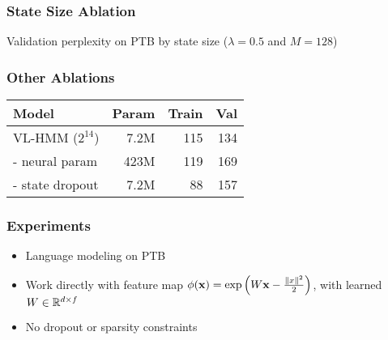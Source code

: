 \documentclass{beamer}
\begin{document}
\begin{frame}
\frametitle{State Size Ablation}

\centering
{}

\vspace{2em}

Validation perplexity on PTB by state size ($\lambda =0.5$ and $M=128$)
\end{frame}

\begin{frame}
\frametitle{Other Ablations}

\begin{center}
\begin{tabular}{lrrr}
\toprule
Model                 & Param & Train & Val\\
\midrule
VL-HMM ($2^{14}$)     & 7.2M & 115    & 134 \\
\quad - neural param  & 423M & 119    & 169 \\
\quad - state dropout & 7.2M & 88     & 157 \\
\bottomrule
\end{tabular}
\end{center}
\end{frame}

\begin{frame}
\frametitle{Experiments}
\begin{itemize}
\item Language modeling on PTB
\vspace{2em}
\item Work directly with feature map $\phi(\mathbf{x}) = \exp\left(W\mathbf{x} - \frac{\|x\|^2}{2}\right)$,
with learned $W\in\mathbb{R}^{d \times f}$
\vspace{2em}
\item No dropout or sparsity constraints
\end{itemize}
\end{frame}
\end{document}
